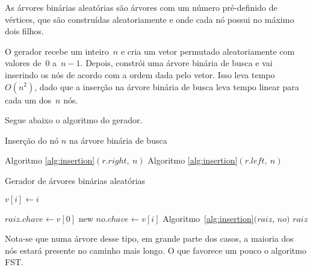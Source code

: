 \documentclass[a4paper,12pt]{article}
\begin{document}
	As árvores binárias aleatórias são árvores com um número 
	pré-definido de vértices, que são construídas aleatoriamente e 
	onde cada nó possui no máximo dois filhos.

	O gerador recebe um inteiro~$n$ e cria um vetor permutado 
	aleatoriamente com valores de~$0$ a~$n-1$.
	Depois, constrói uma árvore binária de busca e vai inserindo 
	os nós de acordo com a ordem dada pelo vetor.
	Isso leva tempo~$O(n^2)$, dado que a inserção na árvore 
	binária de busca leva tempo linear para cada um dos~$n$ nós.

	Segue abaixo o algoritmo do gerador.
	\bigskip
	\bigskip

	\begin{algorithm}[H]
	\label{alg:insertion}

		\caption{Inserção do nó $n$ na árvore binária de busca}
		\Output{}
		{
			{
				Algoritmo \ref{alg:insertion}$(r.right,~n)$\;
			}
		}
		{
			{
				Algoritmo \ref{alg:insertion}$(r.left, ~n)$\;
			}
		}

	\end{algorithm}	

	\bigskip

	\begin{algorithm}[H]
	\label{alg:ABAgenerator}

		\caption{Gerador de árvores binárias aleatórias}
		\bigskip
		{
			$v[i] \gets i$\;
		}

		\bigskip
		$raiz.chave\gets v[0]$\;
		{
			new $no.chave\gets v[i]$\;
			Algoritmo~\ref{alg:insertion}$(raiz$, $no)$\;
		}
		\Return $raiz$\;

	\end{algorithm}	

	\bigskip
	\bigskip

	Nota-se que numa árvore desse tipo, em grande parte dos 
	casos, a maioria dos nós estará presente no caminho mais 
	longo. 
	O que favorece um pouco o algoritmo FST.
\end{document}
